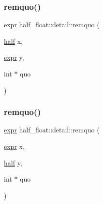 \subsubsection{\texorpdfstring{remquo()}{remquo()}\hspace{0.1cm}{\footnotesize\ttfamily [2/4]}}
{\footnotesize\ttfamily \hyperlink{structhalf__float_1_1detail_1_1expr}{expr} half\+\_\+float\+::detail\+::remquo (\begin{DoxyParamCaption}\item[{\hyperlink{classhalf__float_1_1half}{half}}]{x,  }\item[{\hyperlink{structhalf__float_1_1detail_1_1expr}{expr}}]{y,  }\item[{int $\ast$}]{quo }\end{DoxyParamCaption})\hspace{0.3cm}{\ttfamily [inline]}}

\mbox{\label{namespacehalf__float_1_1detail_a550caa1e77f29aa409a10b3f9c238c0a}} 
\subsubsection{\texorpdfstring{remquo()}{remquo()}\hspace{0.1cm}{\footnotesize\ttfamily [3/4]}}
{\footnotesize\ttfamily \hyperlink{structhalf__float_1_1detail_1_1expr}{expr} half\+\_\+float\+::detail\+::remquo (\begin{DoxyParamCaption}\item[{\hyperlink{structhalf__float_1_1detail_1_1expr}{expr}}]{x,  }\item[{\hyperlink{classhalf__float_1_1half}{half}}]{y,  }\item[{int $\ast$}]{quo }\end{DoxyParamCaption})\hspace{0.3cm}{\ttfamily [inline]}}

\mbox{\label{namespacehalf__float_1_1detail_aebf442dc0106b9d1efcd140bdf7c6afe}} 
